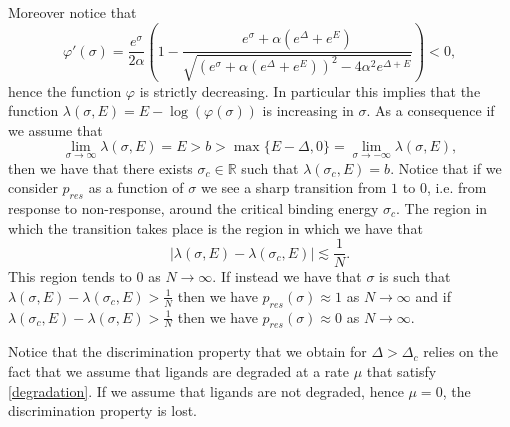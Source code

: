 \documentclass{article}
\numberwithin{equation}{section}
\theoremstyle{plain}
\begin{document}
Moreover notice that 
\[
\varphi'(\sigma)= \frac{e^\sigma}{2 \alpha } \left( 1  - \frac{e^\sigma + \alpha (e^\Delta + e^E)  }{ \sqrt{(e^\sigma + \alpha (e^\Delta + e^E) )^2 - 4 \alpha^2  e^{\Delta + E} } } \right) <0, 
\]
hence the function $\varphi$ is strictly decreasing. In particular this implies that the function $\lambda(\sigma, E)= E- \log(\varphi(\sigma)) $ is increasing in $\sigma$. 
As a consequence if we assume that 
\begin{equation} \label{conditions on b}
\lim_{\sigma \to \infty } \lambda(\sigma, E)  = E>  b > \max\{  E - \Delta  , 0 \} = \lim_{\sigma \to - \infty } \lambda(\sigma, E),    
\end{equation}
then we have that there exists $\sigma_c \in \mathbb R $ such that $\lambda(\sigma_c , E) = b $. 
Notice that if we consider $p_{res} $ as a function of $\sigma $ we see a sharp transition from $1$ to $0$, i.e. from response to non-response, around the critical binding energy $\sigma_c $. 
The region in which the transition takes place is the region in which we have that 
\[
|\lambda (\sigma, E) - \lambda (\sigma_c, E) | \lesssim \frac{1}{N }. 
\]
This region tends to $0 $ as $N \to \infty $. 
If instead we have that $\sigma $ is such that $\lambda (\sigma, E ) - \lambda (\sigma_c, E ) > \frac{1}{N }$ then we have $p_{res}(\sigma) \approx 1 $ as $N \to \infty $ and if $\lambda (\sigma_c, E) - \lambda (\sigma, E) > \frac{1}{N }$ then we have $p_{res} (\sigma) \approx 0$ as $N \to \infty$.







Notice that the discrimination property that we obtain for $\Delta > \Delta_c$ relies on the fact that we assume that ligands are degraded at a rate $\mu $ that satisfy \eqref{degradation}. If we assume that ligands are not degraded, hence $\mu =0$, the discrimination property is lost.  
\end{document}
